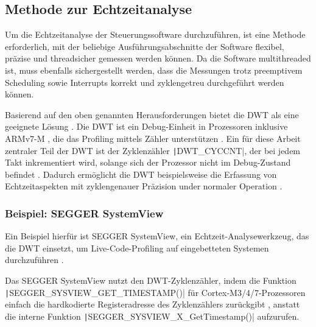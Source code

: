 \subsection{Methode zur Echtzeitanalyse}

Um die Echtzeitanalyse der Steuerungssoftware durchzuführen, ist eine Methode
erforderlich, mit der beliebige Ausführungsabschnitte der Software flexibel,
präzise und threadsicher gemessen werden können. Da die Software multithreaded
ist, muss ebenfalls sichergestellt werden, dass die Messungen trotz preemptivem
Scheduling sowie Interrupts korrekt und zyklengetreu durchgeführt werden können.

Basierend auf den oben genannten Herausforderungen bietet die \ac{DWT} als eine
geeignete Lösung \cite{ARM_KA001499}. Die DWT ist ein Debug-Einheit in
Prozessoren inklusive ARMv7-M \cite{ARMv7_ref_man_dwt_about}, die das Profiling
mittels Zähler unterstützen \cite{ARMv7_ref_man_dwt_profiling}. Ein für diese
Arbeit zentraler Teil der DWT ist der Zyklenzähler \texttt|DWT_CYCCNT|,
der bei jedem Takt inkrementiert wird, solange sich der Prozessor nicht im
Debug-Zustand befindet \cite{ARMv7_ref_man_dwt_cycle}. Dadurch ermöglicht die
DWT beispielsweise die Erfassung von Echtzeitaspekten mit zyklengenauer
Präzision under normaler Operation \cite{ARMv7_ref_man_dwt}.

\subsubsection{Beispiel: SEGGER SystemView}

Ein Beispiel hierfür ist SEGGER SystemView, ein Echtzeit-Analysewerkzeug, das
die DWT einsetzt, um Live-Code-Profiling auf eingebetteten Systemen
durchzuführen \cite{SEGGER_SystemView}.

Das SEGGER SystemView nutzt den DWT-Zyklenzähler, indem die Funktion \linebreak
\texttt|SEGGER_SYSVIEW_GET_TIMESTAMP()| für Cortex-M3/4/7-Prozessoren
einfach die hardkodierte Registeradresse des Zyklenzählers zurückgibt \cite[S.
65]{Segger_SystemView_manual}\cite{Arm_DWT_Programmers_Model}, anstatt die
interne Funktion \texttt|SEGGER_SYSVIEW_X_GetTimestamp()| aufzurufen.
